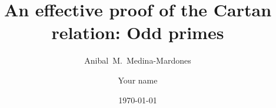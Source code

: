 \documentclass{amsart}
\title{An effective proof of the Cartan relation: Odd primes}
\author[A.~Medina-Mardones]{Anibal~M.~Medina-Mardones}
\author[Your short name]{Your name}
\date{\today}
\begin{document}
	
	\maketitle
	
	
	
	
	
	\newpage
	\sloppy
	\printbibliography
\end{document}
